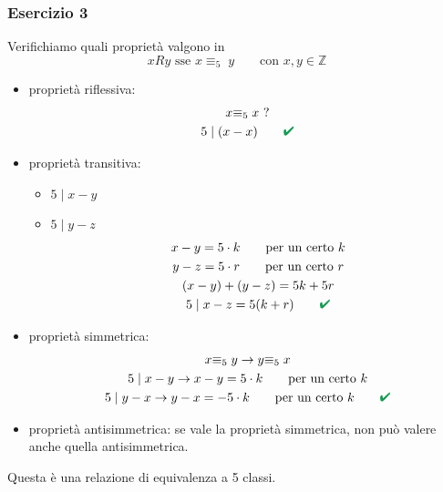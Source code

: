 \documentclass[italian]{article}
\newcommand{\divides}[2]{\text{$#1 \;|\; #2$}}
\newcommand{\congruente}[1]{\text{$\equiv_{#1}\;$}}
\renewcommand{\checkmark}{\textcolor{ForestGreen}{\text{$\qquad$\ding{52}}}}
\newcommand{\ins}[1]{\text{$\mathbb{#1}$}}
\begin{document}
\newpage
\subsubsection{Esercizio 3}
Verifichiamo quali proprietà valgono in
\[
	xRy \text{ sse } x \congruente{5} y \qquad \text{con } x,y \in \ins{Z}
\]
\begin{itemize}
	\item proprietà riflessiva: 
		\begin{gather*}
			x \congruente{5} x \text{ ?}\\
			\divides{5}{(x-x)} \checkmark
		\end{gather*}
	\item proprietà transitiva: 
		\begin{itemize}
			\item $\divides{5}{x-y}$
			\item $\divides{5}{y-z}$
				\begin{gather*}
					x-y = 5\cdot k \qquad \text{per un certo $k$} \\
					y-z = 5\cdot r \qquad \text{per un certo $r$} \\
					(x-y) + (y-z) = 5k + 5r \\
					\divides{5}{x-z} = 5(k+r) \checkmark
				\end{gather*}
		\end{itemize}
	\item proprietà simmetrica: 
		\begin{gather*}
			x\congruente{5} y \to y \congruente{5} x \\
			\divides{5}{x-y} \to x-y = 5\cdot k \qquad \text{per un certo $k$}\\
			\divides{5}{y-x} \to y-x = -5\cdot k \qquad \text{per un certo $k$} \checkmark
		\end{gather*}
	\item proprietà antisimmetrica: se vale la proprietà simmetrica, non può valere anche quella antisimmetrica.
\end{itemize}
Questa è una relazione di equivalenza a 5 classi.
\end{document}
